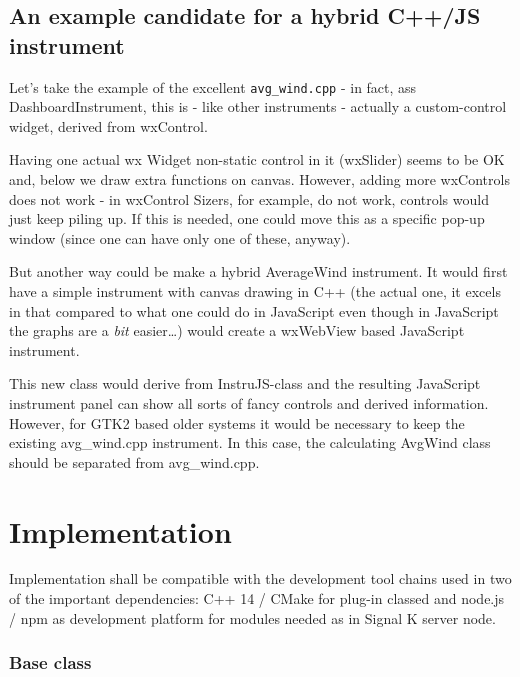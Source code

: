 \documentclass[11pt]{article}
\begin{document}
    \hypertarget{an-example-candidate-for-a-hybrid-cjs-instrument}{%
\subsection{An example candidate for a hybrid C++/JS
instrument}\label{an-example-candidate-for-a-hybrid-cjs-instrument}}

    Let's take the example of the excellent \texttt{avg\_wind.cpp} - in
fact, ass DashboardInstrument, this is - like other instruments -
actually a custom-control widget, derived from wxControl.

Having one actual wx Widget non-static control in it (wxSlider) seems to
be OK and, below we draw extra functions on canvas. However, adding more
wxControls does not work - in wxControl Sizers, for example, do not
work, controls would just keep piling up. If this is needed, one could
move this as a specific pop-up window (since one can have only one of
these, anyway).

But another way could be make a hybrid AverageWind instrument. It would
first have a simple instrument with canvas drawing in C++ (the actual
one, it excels in that compared to what one could do in JavaScript even
though in JavaScript the graphs are a \emph{bit} easier\ldots) would
create a wxWebView based JavaScript instrument.

This new class would derive from InstruJS-class and the resulting
JavaScript instrument panel can show all sorts of fancy controls and
derived information. However, for GTK2 based older systems it would be
necessary to keep the existing avg\_wind.cpp instrument. In this case,
the calculating AvgWind class should be separated from avg\_wind.cpp.

    \hypertarget{implementation}{%
\section{Implementation}\label{implementation}}

    Implementation shall be compatible with the development tool chains used
in two of the important dependencies: C++ 14 / CMake for plug-in classed
and node.js / npm as development platform for modules needed as in
Signal K server node.

    \hypertarget{base-class}{%
\subsubsection{Base class}\label{base-class}}
\end{document}
